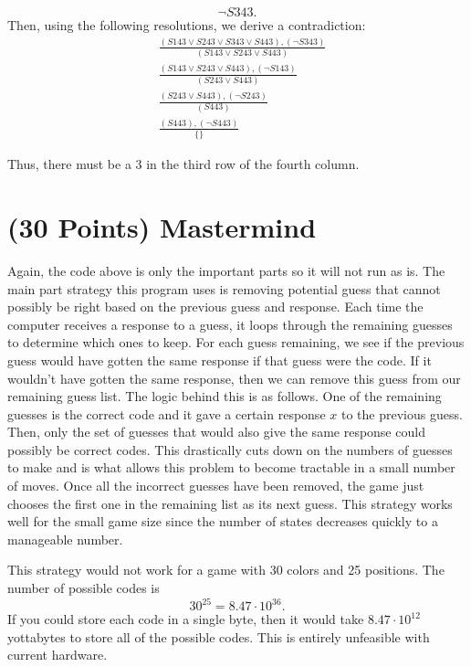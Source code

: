 \documentclass{article}
\begin{document}
\begin{enumerate}
\begin{enumerate}
\begin{equation*}
			\neg S343.
			\end{equation*}
			Then, using the following resolutions, we derive a contradiction:
			\begin{align*}
			&\frac{(S143 \lor S243 \lor S343 \lor S443),(\neg S343)}{(S143 \lor S243 \lor S443)} \\
			&\frac{(S143 \lor S243 \lor S443),(\neg S143)}{(S243 \lor S443)} \\
			&\frac{(S243 \lor S443),(\neg S243)}{(S443)} \\
			&\frac{(S443),(\neg S443)}{\{\}}
			\end{align*}
		\end{enumerate}
		Thus, there must be a 3 in the third row of the fourth column.
	\end{enumerate}
	\setcounter{section}{3}
	\section{(30 Points) Mastermind}
	
	Again, the code above is only the important parts so it will not run as is. The main part strategy this program uses is removing potential guess that cannot possibly be right based on the previous guess and response. Each time the computer receives a response to a guess, it loops through the remaining guesses to determine which ones to keep. For each guess remaining, we see if the previous guess would have gotten the same response if that guess were the code. If it wouldn't have gotten the same response, then we can remove this guess from our remaining guess list. The logic behind this is as follows. One of the remaining guesses is the correct code and it gave a certain response $x$ to the previous guess. Then, only the set of guesses that would also give the same response could possibly be correct codes. This drastically cuts down on the numbers of guesses to make and is what allows this problem to become tractable in a small number of moves. Once all the incorrect guesses have been removed, the game just chooses the first one in the remaining list as its next guess. This strategy works well for the small game size since the number of states decreases quickly to a manageable number. 
	
	This strategy would not work for a game with 30 colors and 25 positions. The number of possible codes is 
	\[30^{25} = 8.47 \cdot 10^{36}.\]
	If you could store each code in a single byte, then it would take $8.47 \cdot 10^12$ yottabytes to store all of the possible codes. This is entirely unfeasible with current hardware. 
\end{document}
